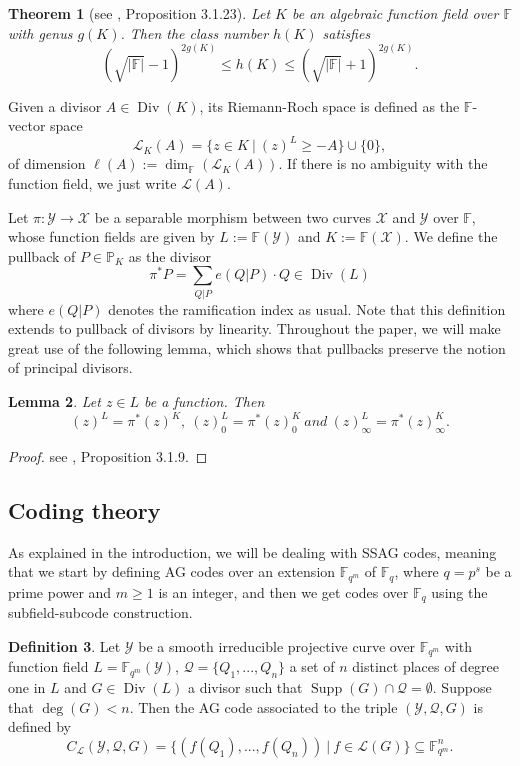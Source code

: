 \documentclass[10pt]{article}
\newtheorem{thm}{Theorem}
\newtheorem{lem1}[thm]{Lemma}
\theoremstyle{definition}
\theoremstyle{definition}
\theoremstyle{definition}
\newtheorem{def1}[thm]{Definition}
\newcommand{\cd}{\cdot}
\newcommand{\F}{\mathbb{F}}
\newcommand{\PP}{\mathbb{P}}
\newcommand{\Fqm}{\mathbb{F}_{q^m}}
\newcommand{\Fq}{\mathbb{F}_q}
\newcommand{\su}{\subseteq}
\newcommand{\X}{\mathcal{X}}
\newcommand{\Y}{\mathcal{Y}}
\newcommand{\QR}{\mathcal{Q}}
\newcommand{\Div}{\operatorname{Div}}
\newcommand{\Supp}{\operatorname{Supp}}
\newcommand{\calL}{\mathcal{L}}
\begin{document}
\begin{thm}[see \cite{Tsf}, Proposition 3.1.23]\label{esti h(X)}
Let $K$ be an algebraic function field over $\F$ with genus $g(K)$. Then the class number $h(K)$ satisfies
\[ (\sqrt{|\F|}-1)^{2g(K)} \leq h(K) \leq (\sqrt{|\F|}+1)^{2g(K)}.\]
\end{thm}

Given a divisor $A \in \Div(K)$, its Riemann-Roch space is defined as the $\F$-vector space
\[\calL_K(A) = \{z \in K \ | \ (z)^L \geq -A\} \cup \{0\},\]
of dimension $\ell(A):= \dim_{\F}(\calL_K(A))$. If there is no ambiguity with the function field, we just write $\calL(A)$.

Let $\pi : \Y \rightarrow \X$ be a separable morphism between two curves $\X$ and $\Y$ over $\F$, whose function fields are given by $L := \F(\Y)$ and $K:=\F(\X)$. We define the pullback of $P \in \PP_K$ as the divisor
\[\pi^{*}P = \sum\limits_{Q|P} e(Q|P) \cd Q \in \Div(L)\]
where $e(Q|P)$ denotes the ramification index as usual.
Note that this definition extends to pullback of divisors by linearity.
Throughout the paper, we will make great use of the following lemma, which shows that pullbacks preserve the notion of principal divisors.

\begin{lem1} \label{tirarr}
Let $z \in L$ be a function. Then 
\[(z)^L = \pi^*(z)^K, \ (z)^L_0 = \pi^*(z)_0^K \ and \ (z)^L_{\infty} = \pi^*(z)^K_{\infty}.\]
\end{lem1} 

\begin{proof}
see \cite{Sti}, Proposition 3.1.9.
\end{proof}


\subsection{Coding theory}


As explained in the introduction, we will be dealing with SSAG codes, meaning that we start by defining AG codes over an extension $\Fqm$ of $\Fq$, where $q=p^s$ be a prime power and $m \geq 1$ is an integer,
and then we get codes over $\Fq$ using the subfield-subcode construction.

\begin{def1} \label{defagcode}
Let $\Y$ be a smooth irreducible projective curve over $\Fqm$ with function field $L = \Fqm(\Y)$, $\QR = \{Q_1,...,Q_n\}$ a set of $n$ distinct places of degree one in $L$  and $G \in \Div(L)$ a divisor such that $\Supp(G) \cap \QR = \emptyset$. Suppose that $\deg(G)<n$. Then the AG code associated to the triple $(\Y,\QR,G)$ is defined by
\[C_{\calL}(\Y,\QR,G) = \{ (f(Q_1),...,f(Q_n)) \ | \ f \in \calL(G)\} \su \Fqm^n.\]
\end{def1}
\end{document}
